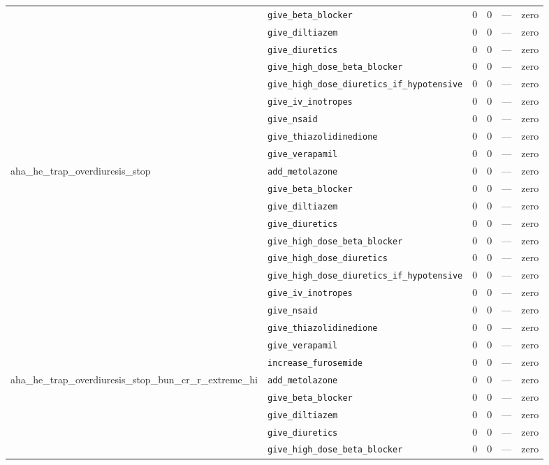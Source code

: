 \begin{table}[ht]
\begin{tabular}{llrrrl}
 & \texttt{give\_beta\_blocker} & 0 & 0 & — & zero \\
 & \texttt{give\_diltiazem} & 0 & 0 & — & zero \\
 & \texttt{give\_diuretics} & 0 & 0 & — & zero \\
 & \texttt{give\_high\_dose\_beta\_blocker} & 0 & 0 & — & zero \\
 & \texttt{give\_high\_dose\_diuretics\_if\_hypotensive} & 0 & 0 & — & zero \\
 & \texttt{give\_iv\_inotropes} & 0 & 0 & — & zero \\
 & \texttt{give\_nsaid} & 0 & 0 & — & zero \\
 & \texttt{give\_thiazolidinedione} & 0 & 0 & — & zero \\
 & \texttt{give\_verapamil} & 0 & 0 & — & zero \\
\midrule
aha\_he\_trap\_overdiuresis\_stop & \texttt{add\_metolazone} & 0 & 0 & — & zero \\
 & \texttt{give\_beta\_blocker} & 0 & 0 & — & zero \\
 & \texttt{give\_diltiazem} & 0 & 0 & — & zero \\
 & \texttt{give\_diuretics} & 0 & 0 & — & zero \\
 & \texttt{give\_high\_dose\_beta\_blocker} & 0 & 0 & — & zero \\
 & \texttt{give\_high\_dose\_diuretics} & 0 & 0 & — & zero \\
 & \texttt{give\_high\_dose\_diuretics\_if\_hypotensive} & 0 & 0 & — & zero \\
 & \texttt{give\_iv\_inotropes} & 0 & 0 & — & zero \\
 & \texttt{give\_nsaid} & 0 & 0 & — & zero \\
 & \texttt{give\_thiazolidinedione} & 0 & 0 & — & zero \\
 & \texttt{give\_verapamil} & 0 & 0 & — & zero \\
 & \texttt{increase\_furosemide} & 0 & 0 & — & zero \\
\midrule
aha\_he\_trap\_overdiuresis\_stop\_bun\_cr\_r\_extreme\_hi & \texttt{add\_metolazone} & 0 & 0 & — & zero \\
 & \texttt{give\_beta\_blocker} & 0 & 0 & — & zero \\
 & \texttt{give\_diltiazem} & 0 & 0 & — & zero \\
 & \texttt{give\_diuretics} & 0 & 0 & — & zero \\
 & \texttt{give\_high\_dose\_beta\_blocker} & 0 & 0 & — & zero \\

\end{tabular}
\end{table}
